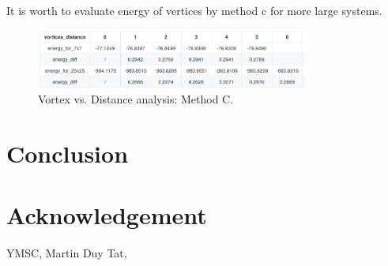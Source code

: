 \documentclass{article}
\begin{document}
It is worth to evaluate energy of vertices by method c for more large systems.

\begin{figure}[!htb]
	\centering
	\includegraphics[width=0.8\textwidth]{./images/vort_dis_c.png}
	\caption{\label{tab:vort_dis} Vortex vs. Distance analysis: Method C.} 
\end{figure}




\section{Conclusion}\label{sec6}
\label{sec:conclusion}


\section{Acknowledgement}
YMSC, Martin Duy Tat, 



\end{document}
